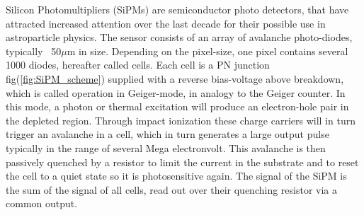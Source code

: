 \documentclass[12pt,article,type=msc,colorback,accentcolor=tud9c]{tudthesis}
\begin{document}
\begin{figure}[h]
\begin{centering}
}
\caption{}
\label{fig:PMT_SiPM_Size}
\end{centering}
\end{figure}

Silicon Photomultipliers (SiPMs) are semiconductor photo detectors, that have attracted increased attention over the last decade for their possible use in astroparticle physics. The sensor consists of an array of avalanche photo-diodes, typically ~50$\mu$m in size. Depending on the pixel-size, one pixel contains several 1000 diodes, hereafter called cells. Each cell is a PN junction fig(\ref{fig:SiPM_scheme}) supplied with a reverse bias-voltage above breakdown, which is called operation in Geiger-mode, in analogy to the Geiger counter. In this mode, a photon or thermal excitation will produce an electron-hole pair in the depleted region. Through impact ionization these charge carriers will in turn trigger an avalanche in a cell, which in turn generates a large output pulse typically in the range of several Mega electronvolt. This avalanche is then passively quenched by a resistor to limit the current in the substrate and to reset the cell to a quiet state so it is photosensitive again. The signal of the SiPM is the sum of the signal of all cells, read out over their quenching resistor via a common output.\\

\begin{figure}[h]
\begin{centering}
}
\caption{}
\label{fig:SiPM_scheme}
\end{centering}
\end{figure}
\end{document}
